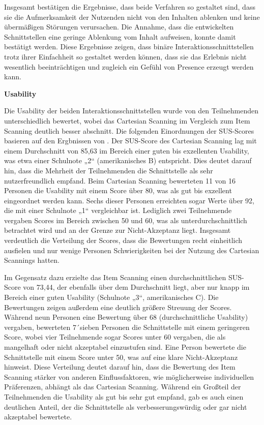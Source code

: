Insgesamt bestätigen die Ergebnisse, dass beide Verfahren so gestaltet sind, dass sie die Aufmerksamkeit der Nutzenden nicht von den Inhalten ablenken und keine übermäßigen Störungen verursachen. Die Annahme, dass die entwickelten Schnittstellen eine geringe Ablenkung vom Inhalt aufweisen, konnte damit bestätigt werden. Diese Ergebnisse zeigen, dass binäre Interaktionsschnittstellen trotz ihrer Einfachheit so gestaltet werden können, dass sie das Erlebnis nicht wesentlich beeinträchtigen und zugleich ein Gefühl von Presence erzeugt werden kann.

\textbf{Usability}

Die Usability der beiden Interaktionsschnittstellen wurde von den Teilnehmenden unterschiedlich bewertet, wobei das Cartesian Scanning im Vergleich zum Item Scanning deutlich besser abschnitt. Die folgenden Einordnungen der SUS-Scores basieren auf den Ergbnissen von \citet{bangor_empirical_2008}. Der SUS-Score des Cartesian Scanning lag mit einem Durchschnitt von 85,63 im Bereich einer guten bis exzellenten Usability, was etwa einer Schulnote „2“ (amerikanisches B) entspricht. Dies deutet darauf hin, dass die Mehrheit der Teilnehmenden die Schnittstelle als sehr nutzerfreundlich empfand.
Beim Cartesian Scanning bewerteten 11 von 16 Personen die Usability mit einem Score über 80, was als gut bis exzellent eingeordnet werden kann. Sechs dieser Personen erreichten sogar Werte über 92, die mit einer Schulnote „1“ vergleichbar ist. Lediglich zwei Teilnehmende vergaben Scores im Bereich zwischen 50 und 60, was als unterdurchschnittlich betrachtet wird und an der Grenze zur Nicht-Akzeptanz liegt. Insgesamt verdeutlich die Verteilung der Scores, dass die Bewertungen recht einheitlich ausfielen und nur wenige Personen Schwierigkeiten bei der Nutzung des Cartesian Scannings hatten.

Im Gegensatz dazu erzielte das Item Scanning einen durchschnittlichen SUS-Score von 73,44, der ebenfalls über dem Durchschnitt liegt, aber nur knapp im Bereich einer guten Usability (Schulnote „3“, amerikanisches C). Die Bewertungen zeigen außerdem eine deutlich größere Streuung der Scores. Während neun Personen eine Bewertung über 68 (durchschnittliche Usability) vergaben, bewerteten 7´sieben Personen die Schnittstelle mit einem geringeren Score, wobei vier Teilnehmende sogar Scores unter 60 vergaben, die als mangelhaft oder nicht akzeptabel einzustufen sind. Eine Person bewertete die Schnittstelle mit einem Score unter 50, was auf eine klare Nicht-Akzeptanz hinweist.
Diese Verteilung deutet darauf hin, dass die Bewertung des Item Scanning stärker von anderen Einflussfaktoren, wie möglicherweise individuellen Präferenzen, abhängt als das Cartesian Scanning. Während ein Großteil der Teilnehmenden die Usability als gut bis sehr gut empfand, gab es auch einen deutlichen Anteil, der die Schnittstelle als verbesserungswürdig oder gar nicht akzeptabel bewertete.

